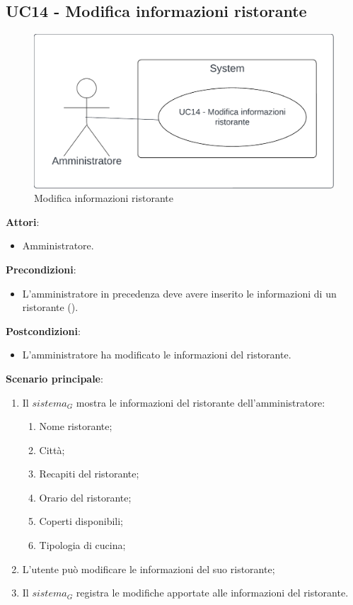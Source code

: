 \subsection{UC14 - Modifica informazioni ristorante} \label{usecase:14}
\begin{figure}[H]
    \centering
    \includegraphics[width=0.9\linewidth]{ucd/ucd14.png}
    \caption{Modifica informazioni ristorante}
\end{figure}
\textbf{Attori}:
\begin{itemize}
    \item Amministratore.
\end{itemize}
\textbf{Precondizioni}:
\begin{itemize}
    \item L'amministratore in precedenza deve avere inserito le informazioni di un ristorante ().
\end{itemize}
\textbf{Postcondizioni}:
\begin{itemize}
    \item L'amministratore ha modificato le informazioni del ristorante.
\end{itemize}
\textbf{Scenario principale}:
\begin{enumerate}
    \item Il $\textit{sistema}_G$ mostra le informazioni del ristorante dell'amministratore:
    \begin{enumerate}
        \item Nome ristorante;
        \item Città;
        \item Recapiti del ristorante;
        \item Orario del ristorante;
        \item Coperti disponibili;
        \item Tipologia di cucina;
    \end{enumerate}
    \item L'utente può modificare le informazioni del suo ristorante;
    \item Il $\textit{sistema}_G$ registra le modifiche apportate alle informazioni del ristorante.
\end{enumerate}
\newpage
